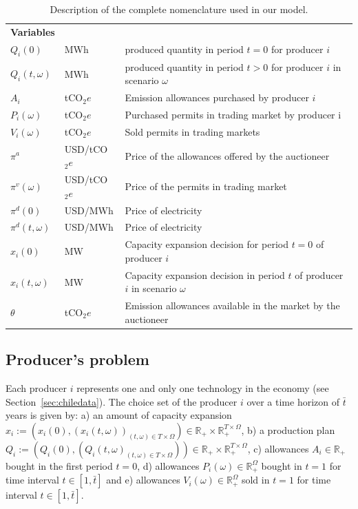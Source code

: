 \documentclass[11pt, letterpaper]{article}
\begin{document}
\begin{table}
\begin{tabular}{  l l l }
\hline
 \textbf{Variables}   &  &  \\ 
 $Q_i(0)$ & MWh & produced quantity in period $t = 0 $ for producer $i$\\
 $Q_i(t,\omega)$ & MWh & produced quantity in period $t > 0 $ for producer $i$ in scenario $\omega$ \\  
 $A_i$ & tCO$_2e$ & Emission allowances purchased by producer $i$ \\ 
 $P_i(\omega)$ & tCO$_2e$ & Purchased permits in trading market by producer i  \\
 $V_i(\omega)$ & tCO$_2e$ & Sold permits in trading markets \\
 $\pi^{a}$ &  USD/tCO$_2e$  & Price of the allowances offered by the auctioneer \\
 $\pi^{v}(\omega)$ &  USD/tCO$_2e$  & Price of the permits in trading market \\
  $\pi^d(0)$ &  USD/MWh  & Price of electricity \\
 $\pi^d(t,\omega)$  & USD/MWh  & Price of electricity \\
 $x_i(0)$ &  MW  & Capacity expansion decision for period $t=0$ of producer $i$\\
 $x_i(t,\omega)$ &  MW  & Capacity expansion decision in period $t$ of producer $i$ in scenario $\omega$\\
  $\theta$ &  tCO$_2e$ & Emission allowances available in the market by the auctioneer\\
\hline
\end{tabular}
    \caption{Description of the complete nomenclature used in our model.}
    \label{tab:nom}
\end{table}

\vspace{0.5cm}

\normalsize



\subsection{Producer's problem}
Each producer $i$ represents one and only one technology in the economy (see Section~\ref{sec:chiledata}). The choice set of the producer $i$ over a time horizon of $\bar{t}$ years is given by: a) an amount of capacity expansion $x_i:=\left(x_i(0),(x_i(t,\omega))_{(t,\omega)\in T\times\Omega}\right)\in\mathbb{R}_+\times\mathbb{R}_+^{T\times\Omega}$, b) a production plan $Q_i:=\left(Q_{i}(0),(Q_{i}(t,\omega)_{(t,\omega)\in T\times\Omega})\right)\in\mathbb{R}_+\times\mathbb{R}_+^{T\times\Omega}$, c) allowances $A_i\in\mathbb{R}_+$ bought in the first period $t=0$, d) allowances $P_i(\omega)\in\mathbb{R}_+^{\Omega}$ bought in $t=1$ for time interval $t\in[1,\bar{t}]$  and e) allowances $V_i(\omega)\in\mathbb{R}_+^{\Omega}$ sold in $t=1$ for time interval $t\in[1,\bar{t}]$.
\end{document}
